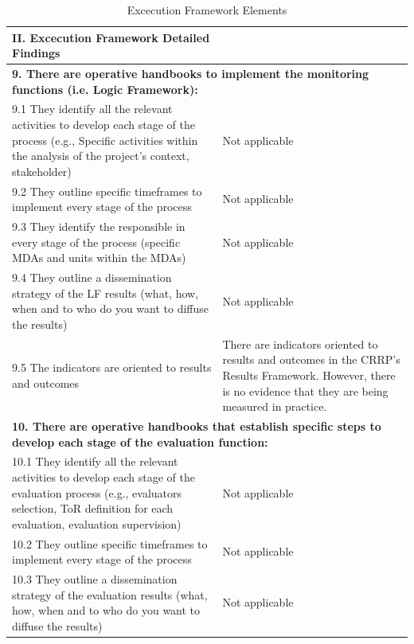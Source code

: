 \documentclass[
  10pt,
]{book}
\begin{document}
\begin{table}

\caption{\label{tab:unnamed-chunk-2}Excecution Framework Elements}
\centering
\begin{tabular}[t]{l|l}
\hline
II. Excecution Framework Detailed Findings &  \\
\hline
\multicolumn{2}{l}{\textbf{9. There are operative handbooks to implement the monitoring functions (i.e. Logic Framework):}}\\
\hline
\hspace{1em}9.1 They identify all the relevant activities to develop each stage of the process (e.g., Specific activities within the analysis of the project's context, stakeholder) & Not applicable\\
\hline
\hspace{1em}9.2 They outline specific timeframes to implement every stage of the process & Not applicable\\
\hline
\hspace{1em}9.3 They identify the responsible in every stage of the process (specific MDAs and units within the MDAs) & Not applicable\\
\hline
\hspace{1em}9.4 They outline a dissemination strategy of the LF results (what, how, when and to who do you want to diffuse the results) & Not applicable\\
\hline
\hspace{1em}9.5 The indicators are oriented to results and outcomes & There are indicators oriented to results and outcomes in the CRRP’s Results Framework. However, there is no evidence that they are being measured in practice.\\
\hline
\multicolumn{2}{l}{\textbf{10. There are operative handbooks that establish specific steps to develop each stage of the evaluation function:}}\\
\hline
\hspace{1em}10.1 They identify all the relevant activities to develop each stage of the evaluation process (e.g., evaluators selection, ToR definition for each evaluation, evaluation supervision) & Not applicable\\
\hline
\hspace{1em}10.2 They outline specific timeframes to implement every stage of the process & Not applicable\\
\hline
\hspace{1em}10.3 They outline a dissemination strategy of the evaluation results (what, how, when and to who do you want to diffuse the results) & Not applicable\\

\end{tabular}
\end{table}
\end{document}
